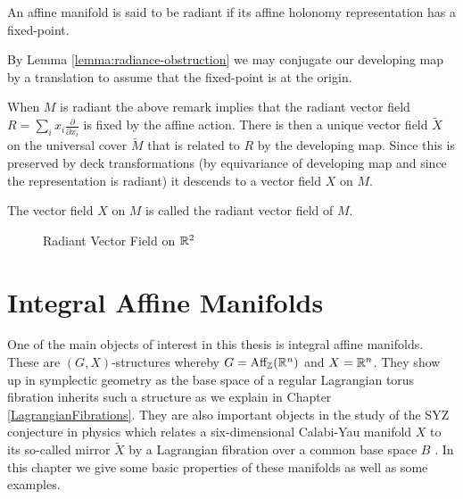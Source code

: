 \begin{definition}
    An affine manifold is said to be radiant if its affine holonomy representation has a fixed-point.
\end{definition}

\begin{remark}
    By Lemma \ref{lemma:radiance-obstruction} we may conjugate our developing map by a translation to assume that
    the fixed-point is at the origin.
\end{remark}

When $M$ is radiant the above remark implies that the radiant vector field $R =
    \sum_i x_i \frac{\partial}{\partial x_i}$ is fixed by the affine action. There
is then a unique vector field $\tilde{X}$ on the universal cover $\tilde{M}$
that is related to $R$ by the developing map. Since this is preserved by deck
transformations (by equivariance of developing map and since the representation
is radiant) it descends to a vector field $X$ on $M$.

\begin{definition}
    The vector field $X$ on $M$ is called the radiant vector field of $M$.
\end{definition}
\begin{figure}[H]
    \centering
    \captionsetup{justification=centering}
    \caption{Radiant Vector Field on $\mathbb{R}^2$}
\end{figure}

\section{Integral Affine Manifolds}
One of the main objects of interest in this thesis is integral affine
manifolds. These are $(G,X)$-structures whereby $G=\text{Aff}_{\mathbb{Z}}(\mathbb{R}^n)$ and $X= \mathbb{R}^n$.
They show up in symplectic geometry as the base space of a regular Lagrangian
torus fibration inherits such a structure as we explain in Chapter
\ref{LagrangianFibrations}. They are also important objects in the study of the
SYZ conjecture in physics which relates a six-dimensional Calabi-Yau manifold
$X$ to its so-called mirror $\tilde{X}$ by a Lagrangian fibration over a common
base space $B$ \cite{SYZ}. In this chapter we give some basic properties of
these manifolds as well as some examples.

